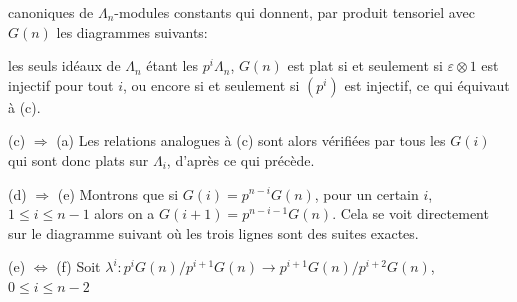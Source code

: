 
canoniques de $\Lambda_n$-modules constants qui donnent, par produit tensoriel
avec $G(n)$ les diagrammes suivants:


les seuls idéaux de $\Lambda_n$ étant les $p^i\Lambda_n$, $G(n)$ est plat si et seulement
si $\varepsilon\otimes 1$ est injectif pour tout $i$, ou encore si et seulement si $(p^i)$
est injectif, ce qui équivaut à (c).

(c) $\Rightarrow$ (a) Les relations analogues à (c) sont alors vérifiées par
tous les $G(i)$ qui sont donc plats sur $\Lambda_i$, d'après ce qui précède.

(d) $\Rightarrow$ (e) Montrons que si $G(i) = p^{n-i}G(n)$, pour un certain $i$,
$1 \leq i \leq n-1$ alors on a $G(i+1) = p^{n-i-1}G(n)$. Cela se voit directement sur
le diagramme suivant où les trois lignes sont des suites exactes.


(e) $\Leftrightarrow$ (f) Soit $\lambda^i : p^iG(n)/p^{i+1}G(n) \rightarrow p^{i+1}G(n)/p^{i+2}G(n)$, $0 \leq i \leq n-2$

